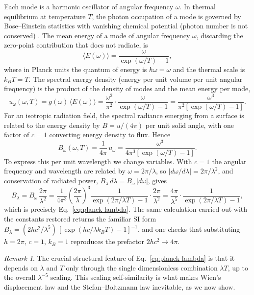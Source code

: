 \documentclass[10pt]{article}
\theoremstyle{definition}
\theoremstyle{remark}
\newtheorem{remark}{Remark}
\begin{document}
Each mode is a harmonic oscillator of angular frequency $\omega$. In thermal equilibrium at temperature $T$, the photon occupation of a mode is governed by Bose--Einstein statistics with vanishing chemical potential (photon number is not conserved) \cite{bose1924,einstein1917}. The mean energy of a mode of angular frequency $\omega$, discarding the zero-point contribution that does not radiate, is
\begin{equation}\label{eq:mean-energy}
\langle E(\omega)\rangle = \frac{\omega}{\exp(\omega/T)-1},
\end{equation}
where in Planck units the quantum of energy is $\hbar\omega = \omega$ and the thermal scale is $k_B T = T$. The spectral energy density (energy per unit volume per unit angular frequency) is the product of the density of modes and the mean energy per mode,
\begin{equation}
u_\omega(\omega,T) = g(\omega)\,\langle E(\omega)\rangle = \frac{\omega^2}{\pi^2}\cdot\frac{\omega}{\exp(\omega/T)-1} = \frac{\omega^3}{\pi^2\!\left[\exp(\omega/T)-1\right]}.
\end{equation}
For an isotropic radiation field, the spectral radiance emerging from a surface is related to the energy density by $B = u/(4\pi)$ per unit solid angle, with one factor of $c=1$ converting energy density to flux. Hence
\begin{equation}
B_\omega(\omega,T) = \frac{1}{4\pi}\,u_\omega = \frac{\omega^3}{4\pi^3\!\left[\exp(\omega/T)-1\right]}.
\end{equation}
To express this per unit wavelength we change variables. With $c=1$ the angular frequency and wavelength are related by $\omega = 2\pi/\lambda$, so $\left|d\omega/d\lambda\right| = 2\pi/\lambda^2$, and conservation of radiated power, $B_\lambda\,d\lambda = B_\omega\,\left|d\omega\right|$, gives
\begin{equation}
B_\lambda = B_\omega\,\frac{2\pi}{\lambda^2}
= \frac{1}{4\pi^3}\left(\frac{2\pi}{\lambda}\right)^{\!3}\frac{1}{\exp(2\pi/\lambda T)-1}\cdot\frac{2\pi}{\lambda^2}
= \frac{4\pi}{\lambda^5}\cdot\frac{1}{\exp(2\pi/\lambda T)-1},
\end{equation}
which is precisely Eq.~\eqref{eq:planck-lambda}. The same calculation carried out with the constants restored returns the familiar SI form $B_\lambda = (2hc^2/\lambda^5)\,[\exp(hc/\lambda k_B T)-1]^{-1}$, and one checks that substituting $h = 2\pi$, $c = 1$, $k_B = 1$ reproduces the prefactor $2hc^2 \to 4\pi$.

\begin{remark}
The crucial structural feature of Eq.~\eqref{eq:planck-lambda} is that it depends on $\lambda$ and $T$ only through the single dimensionless combination $\lambda T$, up to the overall $\lambda^{-5}$ scaling. This scaling self-similarity is what makes Wien's displacement law and the Stefan--Boltzmann law inevitable, as we now show.
\end{remark}
\end{document}
